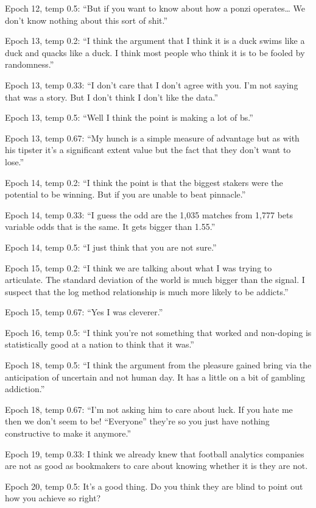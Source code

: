 \documentclass[5p,authoryear]{elsarticle}
\begin{document}
Epoch 12, temp 0.5: “But if you want to know about how a ponzi operates… We don’t know nothing about this sort of shit.”

Epoch 13, temp 0.2: “I think the argument that I think it is a duck swims like a duck and quacks like a duck. I think most people who think it is to be fooled by randomness.”

Epoch 13, temp 0.33: “I don’t care that I don’t agree with you. I’m not saying that was a story. But I don’t think I don’t like the data.”

Epoch 13, temp 0.5: “Well I think the point is making a lot of bs.”

Epoch 13, temp 0.67: “My hunch is a simple measure of advantage but as with his tipster it’s a significant extent value but the fact that they don’t want to lose.”

Epoch 14, temp 0.2: “I think the point is that the biggest stakers were the potential to be winning. But if you are unable to beat pinnacle.”

Epoch 14, temp 0.33: “I guess the odd are the 1,035 matches from 1,777 bets variable odds that is the same. It gets bigger than 1.55.”

Epoch 14, temp 0.5: “I just think that you are not sure.”

Epoch 15, temp 0.2: “I think we are talking about what I was trying to articulate. The standard deviation of the world is much bigger than the signal. I suspect that the log method relationship is much more likely to be addicts.”

Epoch 15, temp 0.67: “Yes I was cleverer.”

Epoch 16, temp 0.5: “I think you’re not something that worked and non-doping is statistically good at a nation to think that it was.”

Epoch 18, temp 0.5: “I think the argument from the pleasure gained bring via the anticipation of uncertain and not human day. It has a little on a bit of gambling addiction.”

Epoch 18, temp 0.67: “I’m not asking him to care about luck. If you hate me then we don’t seem to be! “Everyone” they’re so you just have nothing constructive to make it anymore.”

Epoch 19, temp 0.33: I think we already knew that football analytics companies are not as good as bookmakers to care about knowing whether it is they are not.

Epoch 20, temp 0.5: It’s a good thing. Do you think they are blind to point out how you achieve so right?
\end{document}
